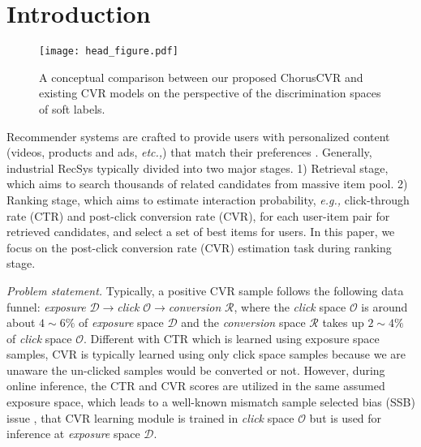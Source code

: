 \section{Introduction}


\begin{figure}[t]
  \centering
  \texttt{[image: head\_figure.pdf]}
  \vspace{-1em}
  \caption{A conceptual comparison between our proposed ChorusCVR and existing CVR models on the perspective of the discrimination spaces of soft labels.}
  \label{intro}
  \vspace{-2em}
\end{figure}
Recommender systems are crafted to provide users with personalized content (videos, products and ads, \emph{etc.,}) that match their preferences \cite{youtubenet,sim,mmoe,din}. Generally, industrial RecSys typically divided into two major stages. 1) Retrieval stage, which aims to search thousands of related candidates from massive item pool. 2) Ranking stage, which aims to estimate interaction probability, \emph{e.g.,} click-through rate (CTR) and post-click conversion rate (CVR), for each user-item pair for retrieved candidates, and select a set of best items for users. In this paper, we focus on the post-click conversion rate (CVR) estimation task during ranking stage.

\textit{Problem statement.} Typically, a positive CVR sample follows the following data funnel: 
%
\textit{exposure} $\mathcal{D}$$\to$\textit{click} $\mathcal{O}$$\to$\textit{conversion} $\mathcal{R}$, where the \textit{click} space $\mathcal{O}$ is around about $4\sim6\%$ of \textit{exposure} space $\mathcal{D}$ and the \textit{conversion} space $\mathcal{R}$ takes up $2\sim4\%$ of \textit{click} space $\mathcal{O}$.
%
Different with CTR which is learned using exposure space samples, CVR is typically learned using only click space samples because we are unaware the un-clicked samples would be converted or not. 
% 
%
However, during online inference, the CTR and CVR scores are utilized in the same assumed exposure space, which leads to a well-known mismatch sample selected bias (SSB) issue \cite{ssb1,ssb2,ssb3,dcmt}, that CVR learning module is trained in \textit{click} space $\mathcal{O}$ but is used for inference at  \textit{exposure} space $\mathcal{D}$.
%









